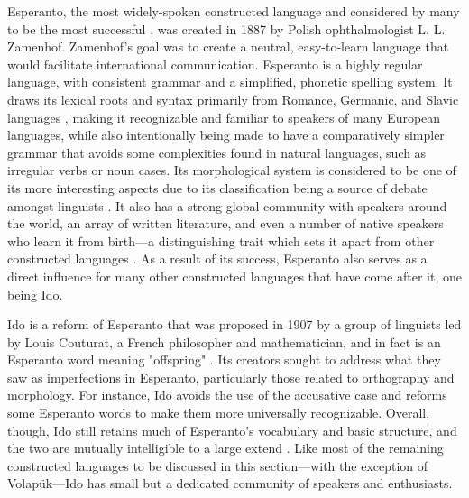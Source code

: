 \documentclass[12pt,a4paper]{article}
\numberwithin{figure}{section}
\numberwithin{table}{section}
\numberwithin{definition}{section}
\begin{document}
Esperanto, the most widely-spoken constructed language and considered by many to be the most successful \parencite{Gobbo2008article}, was created in 1887 by Polish ophthalmologist L. L. Zamenhof. Zamenhof’s goal was to create a neutral, easy-to-learn language that would facilitate international communication. Esperanto is a highly regular language, with consistent grammar and a simplified, phonetic spelling system. It draws its lexical roots and syntax primarily from Romance, Germanic, and Slavic languages \parencite{Gobbo2008article,Gobbo2011article}, making it recognizable and familiar to speakers of many European languages, while also intentionally being made to have a comparatively simpler grammar that avoids some complexities found in natural languages, such as irregular verbs or noun cases. Its morphological system is considered to be one of its more interesting aspects due to its classification being a source of debate amongst linguists \parencite{Reagan2019book}. It also has a strong global community with speakers around the world, an array of written literature, and even a number of native speakers who learn it from birth---a distinguishing trait which sets it apart from other constructed languages \parencite{goodall2022article}. As a result of its success, Esperanto also serves as a direct influence for many other constructed languages that have come after it, one being Ido. 

Ido is a reform of Esperanto that was proposed in 1907 by a group of linguists led by Louis Couturat, a French philosopher and mathematician, and in fact is an Esperanto word meaning "offspring" \parencite{Schubert2001book}. Its creators sought to address what they saw as imperfections in Esperanto, particularly those related to orthography and morphology. For instance, Ido avoids the use of the accusative case and reforms some Esperanto words to make them more universally recognizable. Overall, though, Ido still retains much of Esperanto’s vocabulary and basic structure, and the two are mutually intelligible to a large extend \parencite{goodall2022article,Schubert2001book}. Like most of the remaining constructed languages to be discussed in this section---with the exception of Volapük---Ido has small but a dedicated community of speakers and enthusiasts.
\end{document}

